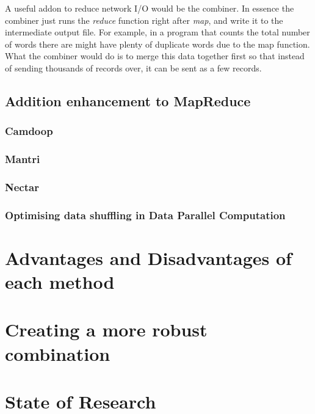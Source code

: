 \documentclass[]{article}
\begin{document}
A useful addon to reduce network I/O would be the combiner. In essence the combiner just runs the \emph{reduce} function right after \emph{map}, and write it to the intermediate output file. For example, in a program that counts the total number of words there are might have plenty of duplicate words due to the map function. What the combiner  would do is to merge this data together first so that instead of sending thousands of records over, it can be sent as a few records.

\subsection{Addition enhancement to MapReduce}
\subsubsection{Camdoop}

\subsubsection{Mantri}

\subsubsection{Nectar}

\subsubsection{Optimising data shuffling in Data Parallel Computation}

\section{Advantages and Disadvantages of each method}
\subsection{}

\subsection{}

\subsection{}

\subsection{}

\subsection{}

\section{Creating a more robust combination}

\section{State of Research}
\end{document}
